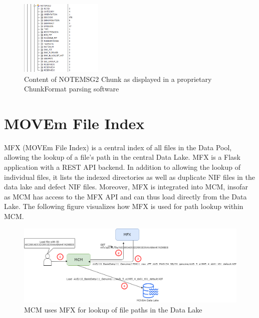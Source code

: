 \begin{figure}
\includegraphics[width=0.35\textwidth]{images/NoteMsg2Chunk}
  \caption{Content of NOTEMSG2 Chunk as displayed in a proprietary ChunkFormat parsing software}\label{fig:notemsg2}
\end{figure}

\section{MOVEm File Index}
MFX (MOVEm File Index) is a central index of all files in the Data Pool, allowing the lookup of a file's path in the central Data Lake. MFX is a Flask application with a REST API backend. In addition to allowing the lookup of individual files, it lists the indexed directories as well as duplicate NIF files in the data lake and defect NIF files. Moreover, MFX is integrated into MCM, insofar as MCM has access to the MFX API and can thus load directly from the Data Lake. The following figure visualizes how MFX is used for path lookup within MCM.
\begin{figure}[ht!]
\includegraphics[width=1.0\textwidth]{images/mfx_usage.png}
  \caption{MCM uses MFX for lookup of file paths in the Data Lake}\label{fig:mfx_usage}
\end{figure}



